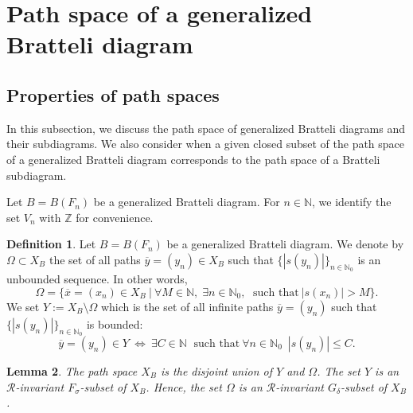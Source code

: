 \documentclass[11pt,reqno]{amsart}
\theoremstyle{definition}
\newtheorem{definition}{Definition}[section]
\theoremstyle{remark}
\theoremstyle{plain}
\newtheorem{lemma}[definition]{Lemma}
\def\ov{\overline}
\newcommand{\N}{\mathbb N}
\newcommand{\Z}{\mathbb Z}
\numberwithin{equation}{section}
\begin{document}
\section{Path space of a generalized Bratteli diagram}
\label{ssect path space}

\subsection{Properties of path spaces}
In this subsection, we discuss the path space of generalized Bratteli diagrams and their subdiagrams. We also consider when a given closed subset of the path space of a generalized Bratteli diagram corresponds to the path space of a Bratteli subdiagram.

Let $B = B(F_n)$ be a generalized Bratteli diagram. For $n \in \N$, we identify the set $V_n$ with $\Z$ for convenience. 

\begin{definition}\label{def_Om_Y} Let $B = B(F_n)$ be a generalized Bratteli diagram. We denote by $\Omega \subset X_B$ the set of all paths $\ov y = (y_n) \in X_B$ such that $\{|s(y_n)|\}_{n \in \N_0}$ is an unbounded sequence. In other words,
$$
\Omega = \{\ov x = (x_n) \in X_B\ | \ \forall M \in \N, \; \exists n \in \N_0, \; \mbox{ such\ that} \ |s(x_n)| > M\}.
$$
We set $Y := X_B \setminus \Omega$ which is the set of all infinite paths $\ov y = (y_n)$ such that $\{|s(y_n)|\}_{n \in \N_0}$ is bounded:
$$
\ov y= (y_n) \in Y \ \Longleftrightarrow\  \exists C \in \N \; 
\mbox{\ such\ that}\ \forall n \in \mathbb{N}_0 \; \ |s(y_n)| \leq C.
$$
\end{definition}

\begin{lemma}\label{lem s4 Y and Omega}
The path space $X_B$ is the disjoint union of $Y$ and $\Omega$. 
The set $Y$ is an $\mathcal{R}$-invariant $F_\sigma$-subset of $X_B$. Hence, the set $\Omega$ is an $\mathcal{R}$-invariant $G_{\delta}$-subset of $X_B$.
\end{lemma}
 
\end{document}
